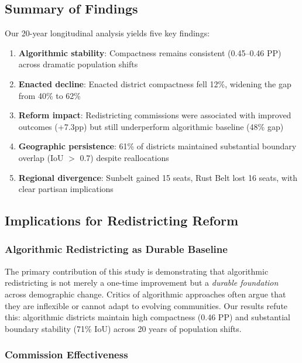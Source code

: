 
\subsection{Summary of Findings}

Our 20-year longitudinal analysis yields five key findings:

\begin{enumerate}
    \item \textbf{Algorithmic stability}: Compactness remains consistent (0.45--0.46 PP) across dramatic population shifts
    \item \textbf{Enacted decline}: Enacted district compactness fell 12\%, widening the gap from 40\% to 62\%
    \item \textbf{Reform impact}: Redistricting commissions were associated with improved outcomes (+7.3pp) but still underperform algorithmic baseline (48\% gap)
    \item \textbf{Geographic persistence}: 61\% of districts maintained substantial boundary overlap (IoU $>$ 0.7) despite reallocations
    \item \textbf{Regional divergence}: Sunbelt gained 15 seats, Rust Belt lost 16 seats, with clear partisan implications
\end{enumerate}

\subsection{Implications for Redistricting Reform}

\subsubsection{Algorithmic Redistricting as Durable Baseline}

The primary contribution of this study is demonstrating that algorithmic redistricting is not merely a one-time improvement but a \textit{durable foundation} across demographic change. Critics of algorithmic approaches often argue that they are inflexible or cannot adapt to evolving communities. Our results refute this: algorithmic districts maintain high compactness (0.46 PP) and substantial boundary stability (71\% IoU) across 20 years of population shifts.

\subsubsection{Commission Effectiveness}

